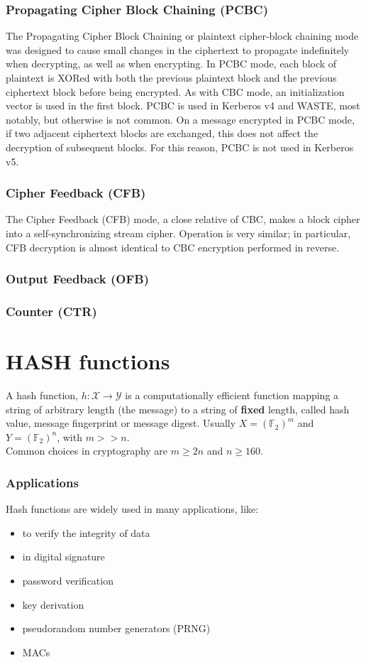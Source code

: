 \documentclass[a4paper, 10pt, titlepage]{article}
\begin{document}
\subsubsection*{Propagating Cipher Block Chaining (PCBC)}
The Propagating Cipher Block Chaining or plaintext cipher-block chaining mode was designed to cause small changes in the ciphertext to propagate indefinitely when decrypting, as well as when encrypting. In PCBC mode, each block of plaintext is XORed with both the previous plaintext block and the previous ciphertext block before being encrypted. As with CBC mode, an initialization vector is used in the first block.
PCBC is used in Kerberos v4 and WASTE, most notably, but otherwise is not common. On a message encrypted in PCBC mode, if two adjacent ciphertext blocks are exchanged, this does not affect the decryption of subsequent blocks. For this reason, PCBC is not used in Kerberos v5.

\subsubsection*{Cipher Feedback (CFB)}
The Cipher Feedback (CFB) mode, a close relative of CBC, makes a block cipher into a self-synchronizing stream cipher. Operation is very similar; in particular, CFB decryption is almost identical to CBC encryption performed in reverse.
\subsubsection*{Output Feedback (OFB)}
\subsubsection*{Counter (CTR)}

\newpage
\section{HASH functions}
A hash function, $h : \mathcal{X} \rightarrow \mathcal{Y}$ is a computationally efficient function mapping a string of arbitrary length (the message) to a string of \textbf{fixed} length, called hash value, message fingerprint or message digest. Usually $X = (\mathbb{F}_2)^m$ and $Y = (\mathbb{F}_2)^n$, with $m >> n$. \\
Common choices in cryptography are $m \geq 2n$ and $n \geq 160$. 
\subsubsection*{Applications}
Hash functions are widely used in many applications, like:
\begin{itemize}
\item to verify the integrity of data
\item in digital signature
\item password verification
\item key derivation
\item pseudorandom number generators (PRNG)
\item MACs
\end{itemize}
\end{document}
